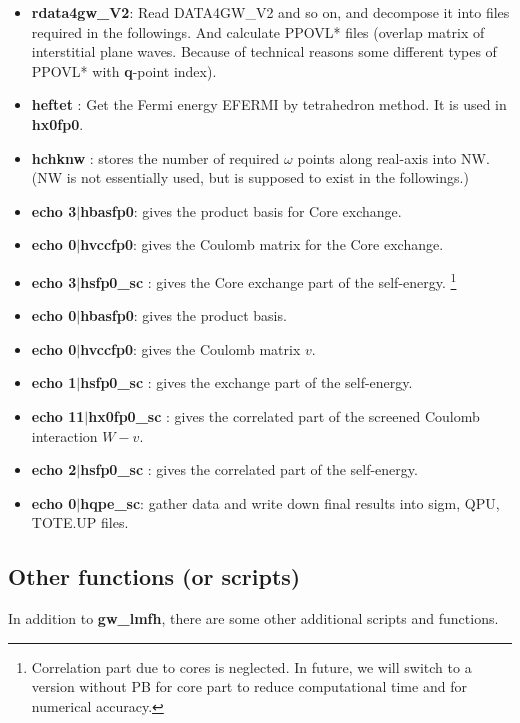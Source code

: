 \documentclass[a4paper,10pt,epsf,fleqn]{article}
\newcommand{\bfq}{{\bf q}}
\begin{document}
{\begin{itemize}
\item{\bf rdata4gw\_V2}: 
  Read {\sf DATA4GW\_V2} and so on, and decompose it into files required
     in the followings. And calculate PPOVL* files (overlap matrix of
     interstitial plane waves. Because of technical reasons some
     different types of PPOVL* with \bfq-point index).
\item{\bf heftet   }: Get the Fermi energy {\sf EFERMI} by tetrahedron method. It is used in {\bf hx0fp0}.
\item{\bf hchknw   }: stores the number of required $\omega$ points along real-axis into {\sf NW}. \\
{\small ({\sf NW} is not essentially used, but is supposed to exist in the followings.)}
\item{\bf echo 3$|$hbasfp0}: gives the product basis for Core exchange.
\item{\bf echo 0$|$hvccfp0}: gives the Coulomb matrix for the Core exchange.
\item{\bf echo 3$|$hsfp0\_sc  }: gives the Core exchange part of the
     self-energy. \footnote{Correlation part due to cores is neglected.
     In future, we will switch to a version without PB for core part to
     reduce computational time and for numerical accuracy.}
\item{\bf echo 0$|$hbasfp0}: gives the product basis.
\item{\bf echo 0$|$hvccfp0}: gives the Coulomb matrix $v$.
\item{\bf echo 1$|$hsfp0\_sc  }: gives the exchange part of the self-energy.
\item{\bf echo 11$|$hx0fp0\_sc }: gives the correlated part of the screened Coulomb interaction $W-v$.
\item{\bf echo 2$|$hsfp0\_sc  }: gives the correlated part of the self-energy.
\item{\bf echo 0$|$hqpe\_sc}: gather data and write down final results
     into {\sf sigm}, {\sf QPU}, {\sf TOTE.UP} files.
\end{itemize}
\vspace{.3cm}



\vspace{3mm}
\subsection{\bf Other functions (or scripts)}
In addition to {\bf gw\_lmfh}, there are some other additional scripts 
and functions.

}
\end{document}
